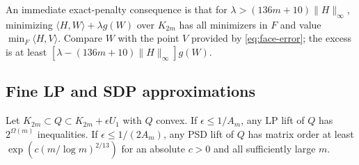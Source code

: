 An immediate exact-penalty consequence is that for
$\lambda>(136m+10)\|H\|_\infty$, minimizing
$\langle H,W\rangle+\lambda g(W)$ over $K_{2m}$ has all minimizers in $F$
and value $\min_F\langle H,V\rangle$. Compare $W$ with the point $V$
provided by \eqref{eq:face-error}; the excess is at least
$[\lambda-(136m+10)\|H\|_\infty]g(W)$.

\subsection{Fine LP and SDP approximations}
\begin{proposition}\label{prop:rank-one-approximation}
Let $K_{2m}\subset Q\subset K_{2m}+\epsilon U_1$ with $Q$ convex.
If $\epsilon\le1/A_m$, any LP lift of $Q$ has $2^{\Omega(m)}$
inequalities. If $\epsilon\le1/(2A_m)$, any PSD lift of $Q$ has matrix
order at least $\exp(c(m/\log m)^{2/13})$ for an absolute $c>0$ and all
sufficiently large $m$.
\end{proposition}
